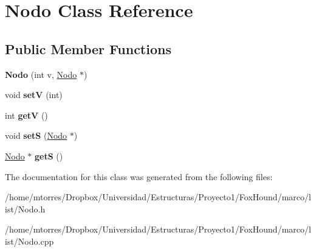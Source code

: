 \hypertarget{class_nodo}{\section{Nodo Class Reference}
\label{class_nodo}
}
\subsection*{Public Member Functions}
\begin{DoxyCompactItemize}
\item 
\hypertarget{class_nodo_adb9b7b95f8632f18d8fc06f196d284a3}{{\bfseries Nodo} (int v, \hyperlink{class_nodo}{Nodo} $\ast$)}\label{class_nodo_adb9b7b95f8632f18d8fc06f196d284a3}

\item 
\hypertarget{class_nodo_a22b287e6e0c09d50ae572333a319afbd}{void {\bfseries set\-V} (int)}\label{class_nodo_a22b287e6e0c09d50ae572333a319afbd}

\item 
\hypertarget{class_nodo_ac6488b06a6cce4fc6044831664906c31}{int {\bfseries get\-V} ()}\label{class_nodo_ac6488b06a6cce4fc6044831664906c31}

\item 
\hypertarget{class_nodo_a5b3d54d4527ba9ac49a27bd56a0e4523}{void {\bfseries set\-S} (\hyperlink{class_nodo}{Nodo} $\ast$)}\label{class_nodo_a5b3d54d4527ba9ac49a27bd56a0e4523}

\item 
\hypertarget{class_nodo_adc1881792620fb0a3eff19989004b34a}{\hyperlink{class_nodo}{Nodo} $\ast$ {\bfseries get\-S} ()}\label{class_nodo_adc1881792620fb0a3eff19989004b34a}

\end{DoxyCompactItemize}


The documentation for this class was generated from the following files\-:\begin{DoxyCompactItemize}
\item 
/home/mtorres/\-Dropbox/\-Universidad/\-Estructuras/\-Proyecto1/\-Fox\-Hound/marco/list/Nodo.\-h\item 
/home/mtorres/\-Dropbox/\-Universidad/\-Estructuras/\-Proyecto1/\-Fox\-Hound/marco/list/Nodo.\-cpp\end{DoxyCompactItemize}

